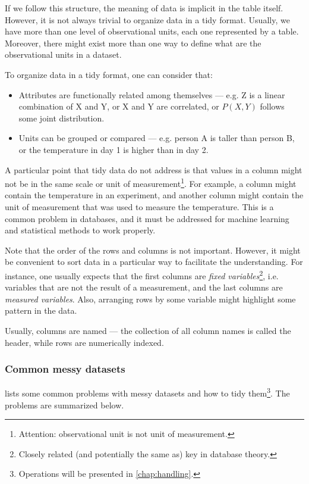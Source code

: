 If we follow this structure, the meaning of data is implicit in the table itself.
However, it is not always trivial to organize data in a tidy format.  Usually, we have
more than one level of observational units, each one represented by a table.  Moreover,
there might exist more than one way to define what are the observational units in a
dataset.

To organize data in a tidy format, one can consider that:
\begin{itemize}
  \item Attributes are functionally related among themselves --- e.g. Z is a linear
    combination of X and Y, or X and Y are correlated, or $P(X, Y)$ follows some joint distribution.
  \item Units can be grouped or compared --- e.g. person A is taller than person B, or
    the temperature in day 1 is higher than in day 2.
\end{itemize}

A particular point that tidy data do not address is that values in a column might not be
in the same scale or unit of measurement\footnote{Attention: observational unit is not
unit of measurement.}.  For example, a column might contain the
temperature in an experiment, and another column might contain the unit of measurement
that was used to measure the temperature.  This is a common problem in databases, and it
must be addressed for machine learning and statistical methods to work properly.

Note that the order of the rows and columns is not important.  However, it might be
convenient to sort data in a particular way to facilitate the understanding.  For
instance, one usually expects that the first columns are \emph{fixed
variables}\footnote{Closely related (and potentially the same as) key in database
theory.}, i.e. variables that are not the result of a measurement, and the last columns
are \emph{measured variables}.  Also, arranging rows by some variable might highlight some
pattern in the data.

Usually, columns are named --- the collection of all column names is called the
header, while rows are numerically indexed.

\subsubsection{Common messy datasets}

\textcite{Wickham2014} lists some common problems with messy datasets and how to tidy
them\footnote{Operations will be presented in \cref{chap:handling}.}.  The problems are
summarized below.

